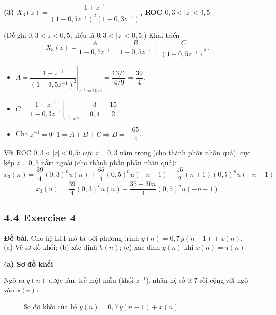 \documentclass[12pt,a4paper]{article}
\begin{document}
\par\smallskip\noindent\textbf{(3) $X_3(z)=\dfrac{1+z^{-1}}{(1-0{,}5z^{-1})^2(1-0{,}3z^{-1})}$, ROC $0{,}3<|z|<0{,}5$}\par
(Đề ghi $0{,}3<z<0{,}5$, hiểu là $0{,}3<|z|<0{,}5$.) Khai triển
\[
X_3(z)=\frac{A}{1-0{,}3z^{-1}}+\frac{B}{1-0{,}5z^{-1}}+\frac{C}{(1-0{,}5z^{-1})^2}.
\]
\begin{itemize}[leftmargin=*]
    \item $A=\left.\dfrac{1+z^{-1}}{(1-0{,}5z^{-1})^2}\right|_{z^{-1}=10/3}=\dfrac{13/3}{4/9}=\dfrac{39}{4}$.
    \item $C=\left.\dfrac{1+z^{-1}}{1-0{,}3z^{-1}}\right|_{z^{-1}=2}=\dfrac{3}{0{,}4}=\dfrac{15}{2}$.
    \item Cho $z^{-1}=0$: $1=A+B+C\Rightarrow B=-\dfrac{65}{4}$.
\end{itemize}
Với ROC $0{,}3<|z|<0{,}5$: cực $z=0{,}3$ nằm trong (cho thành phần nhân quả), cực kép $z=0{,}5$ nằm ngoài (cho thành phần phản nhân quả):
\[
x_3(n)=\frac{39}{4}(0{,}3)^nu(n)+\frac{65}{4}(0{,}5)^nu(-n-1)-\frac{15}{2}(n+1)(0{,}5)^nu(-n-1)
\]
\[
\boxed{\,x_3(n)=\frac{39}{4}(0{,}3)^nu(n)+\frac{35-30n}{4}(0{,}5)^nu(-n-1)\,}
\]

\subsection*{4.4 Exercise 4}
\textbf{Đề bài.} Cho hệ LTI mô tả bởi phương trình $y(n) = 0{,}7\,y(n-1) + x(n)$.
(a) Vẽ sơ đồ khối; (b) xác định $h(n)$; (c) xác định $y(n)$ khi $x(n) = u(n)$.

\par\smallskip\noindent\textbf{(a) Sơ đồ khối}\par
Ngõ ra $y(n)$ được làm trễ một mẫu (khối $z^{-1}$), nhân hệ số $0{,}7$ rồi cộng với ngõ vào $x(n)$:
\begin{figure}[H]
\centering
{}
\caption{Sơ đồ khối của hệ $y(n) = 0{,}7\,y(n-1) + x(n)$}
\end{figure}
\end{document}
